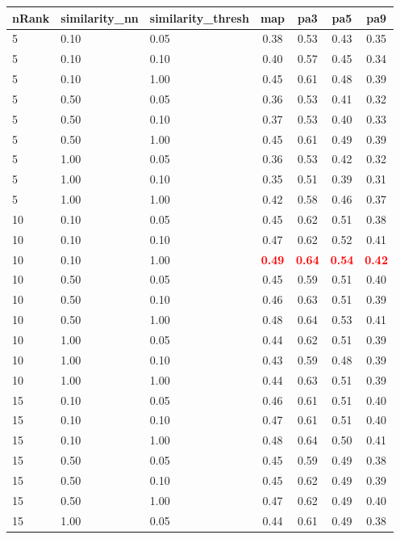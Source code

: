   
\begin{table} 
\begin{center} 
\scriptsize 
 \setlength{\tabcolsep}{.16667em} 
\begin{tabular}{lllcccc} 
nRank & similarity\_nn & similarity\_thresh & map & pa3 & pa5 & pa9 \\ 
\hline 
 5 & 0.10 & 0.05 & 0.38 & 0.53 & 0.43 & 0.35 \\ 
 5 & 0.10 & 0.10 & 0.40 & 0.57 & 0.45 & 0.34 \\ 
 5 & 0.10 & 1.00 & 0.45 & 0.61 & 0.48 & 0.39 \\ 
 5 & 0.50 & 0.05 & 0.36 & 0.53 & 0.41 & 0.32 \\ 
 5 & 0.50 & 0.10 & 0.37 & 0.53 & 0.40 & 0.33 \\ 
 5 & 0.50 & 1.00 & 0.45 & 0.61 & 0.49 & 0.39 \\ 
 5 & 1.00 & 0.05 & 0.36 & 0.53 & 0.42 & 0.32 \\ 
 5 & 1.00 & 0.10 & 0.35 & 0.51 & 0.39 & 0.31 \\ 
 5 & 1.00 & 1.00 & 0.42 & 0.58 & 0.46 & 0.37 \\ 
10 & 0.10 & 0.05 & 0.45 & 0.62 & 0.51 & 0.38 \\ 
10 & 0.10 & 0.10 & 0.47 & 0.62 & 0.52 & 0.41 \\ 
10 & 0.10 & 1.00 & \textbf{\textcolor{red}{0.49}} & \textbf{\textcolor{red}{0.64}} & \textbf{\textcolor{red}{0.54}} & \textbf{\textcolor{red}{0.42}} \\ 
10 & 0.50 & 0.05 & 0.45 & 0.59 & 0.51 & 0.40 \\ 
10 & 0.50 & 0.10 & 0.46 & 0.63 & 0.51 & 0.39 \\ 
10 & 0.50 & 1.00 & 0.48 & 0.64 & 0.53 & 0.41 \\ 
10 & 1.00 & 0.05 & 0.44 & 0.62 & 0.51 & 0.39 \\ 
10 & 1.00 & 0.10 & 0.43 & 0.59 & 0.48 & 0.39 \\ 
10 & 1.00 & 1.00 & 0.44 & 0.63 & 0.51 & 0.39 \\ 
15 & 0.10 & 0.05 & 0.46 & 0.61 & 0.51 & 0.40 \\ 
15 & 0.10 & 0.10 & 0.47 & 0.61 & 0.51 & 0.40 \\ 
15 & 0.10 & 1.00 & 0.48 & 0.64 & 0.50 & 0.41 \\ 
15 & 0.50 & 0.05 & 0.45 & 0.59 & 0.49 & 0.38 \\ 
15 & 0.50 & 0.10 & 0.45 & 0.62 & 0.49 & 0.39 \\ 
15 & 0.50 & 1.00 & 0.47 & 0.62 & 0.49 & 0.40 \\ 
15 & 1.00 & 0.05 & 0.44 & 0.61 & 0.49 & 0.38 \\ 

\end{tabular}
\end{center}
\end{table}
